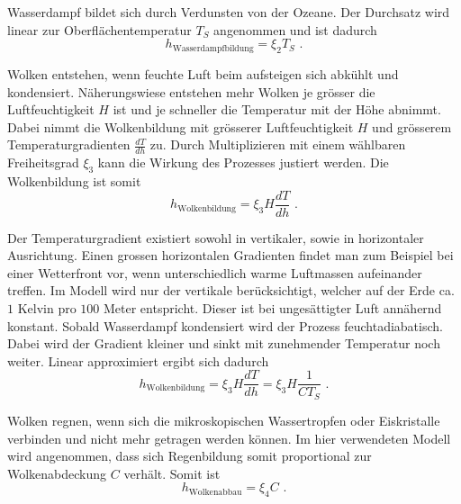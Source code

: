 \begin{refsection}
Wasserdampf bildet sich durch Verdunsten von der Ozeane. Der Durchsatz wird linear zur Oberflächentemperatur $T_S$ angenommen und ist dadurch
\begin{equation}
h_{\text{Wasserdampfbildung}} = \xi_2 T_S \text{ .}
\end{equation}

Wolken entstehen, wenn feuchte Luft beim aufsteigen sich abkühlt und kondensiert. Näherungswiese entstehen mehr Wolken je grösser die Luftfeuchtigkeit $H$ ist und je schneller die Temperatur mit der Höhe abnimmt.
Dabei nimmt die Wolkenbildung mit grösserer Luftfeuchtigkeit $H$ und grösserem Temperaturgradienten $\frac{dT}{dh}$ zu. Durch Multiplizieren mit einem wählbaren Freiheitsgrad $\xi_3$ kann die Wirkung des Prozesses justiert werden. Die Wolkenbildung ist somit
\begin{equation}
h_{\text{Wolkenbildung}} = \xi_3 H \frac{dT}{dh} \text{ .}
\end{equation}

Der Temperaturgradient existiert sowohl in vertikaler, sowie in horizontaler Ausrichtung. Einen grossen horizontalen Gradienten findet man zum Beispiel bei einer Wetterfront vor, wenn unterschiedlich warme Luftmassen aufeinander treffen. Im Modell wird nur der vertikale berücksichtigt, welcher auf der Erde ca. $1$ Kelvin pro $100$ Meter entspricht. Dieser ist bei ungesättigter Luft annähernd konstant. Sobald Wasserdampf kondensiert wird der Prozess feuchtadiabatisch. Dabei wird der Gradient kleiner und sinkt mit zunehmender Temperatur noch weiter. Linear approximiert ergibt sich dadurch
\begin{equation}
h_{\text{Wolkenbildung}} = \xi_3 H \frac{dT}{dh} = \xi_3 H \frac{1}{C T_S} \text{ .}
\end{equation}

Wolken regnen, wenn sich die mikroskopischen Wassertropfen oder Eiskristalle verbinden und nicht mehr getragen werden können. Im hier verwendeten Modell wird angenommen, dass sich Regenbildung somit proportional zur Wolkenabdeckung $C$ verhält. Somit ist
\begin{equation}
h_{\text{Wolkenabbau}} = \xi_4 C \text{ .}
\end{equation}



\end{refsection}
